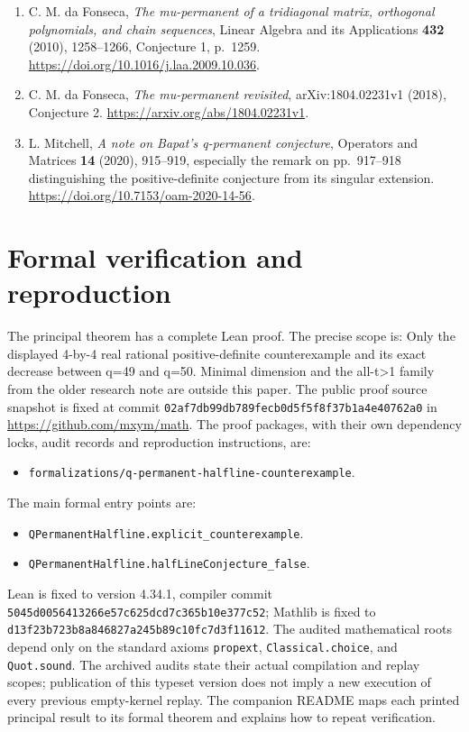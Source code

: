 \documentclass[11pt]{article}
\providecommand{\tightlist}{\setlength{\itemsep}{0pt}\setlength{\parskip}{0pt}}
\begin{document}
\begin{enumerate}
\def\labelenumi{\arabic{enumi}.}
\tightlist
\item
  C. M. da Fonseca, \emph{The mu-permanent of a tridiagonal matrix,
  orthogonal polynomials, and chain sequences}, Linear Algebra and its
  Applications \textbf{432} (2010), 1258--1266, Conjecture 1, p.~1259.
  \url{https://doi.org/10.1016/j.laa.2009.10.036}.
\item
  C. M. da Fonseca, \emph{The mu-permanent revisited},
  arXiv:1804.02231v1 (2018), Conjecture 2.
  \url{https://arxiv.org/abs/1804.02231v1}.
\item
  L. Mitchell, \emph{A note on Bapat's q-permanent conjecture},
  Operators and Matrices \textbf{14} (2020), 915--919, especially the
  remark on pp.~917--918 distinguishing the positive-definite conjecture
  from its singular extension.
  \url{https://doi.org/10.7153/oam-2020-14-56}.
\end{enumerate}

\section{Formal verification and reproduction}
The principal theorem has a complete Lean proof. The precise scope is:
Only the displayed 4-by-4 real rational positive-definite counterexample and its exact decrease between q=49 and q=50. Minimal dimension and the all-t>1 family from the older research note are outside this paper.
The public proof source snapshot is fixed at commit
\nolinkurl{02af7db99db789fecb0d5f5f8f37b1a4e40762a0} in \url{https://github.com/mxym/math}.
The proof packages, with their own dependency locks, audit records and
reproduction instructions, are:
\begin{itemize}
\item \nolinkurl{formalizations/q-permanent-halfline-counterexample}.
\end{itemize}
The main formal entry points are:
\begin{itemize}
\item \nolinkurl{QPermanentHalfline.explicit_counterexample}.
\item \nolinkurl{QPermanentHalfline.halfLineConjecture_false}.
\end{itemize}
Lean is fixed to version 4.34.1, compiler commit
\nolinkurl{5045d0056413266e57c625dcd7c365b10e377c52}; Mathlib is fixed to
\nolinkurl{d13f23b723b8a846827a245b89c10fc7d3f11612}.
The audited mathematical roots depend only on the standard axioms
\texttt{propext}, \texttt{Classical.choice}, and \texttt{Quot.sound}.
The archived audits state their actual compilation and replay scopes;
publication of this typeset version does not imply a new execution of every
previous empty-kernel replay. The companion README maps each printed
principal result to its formal theorem and explains how to repeat verification.
\end{document}
